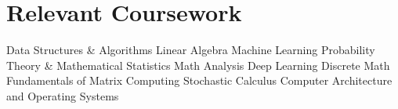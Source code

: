 \section{Relevant Coursework}
\vspace*{-1.5\multicolsep}
\begin{multicols}{4}
    \begin{itemize}[itemsep=0pt, parsep=0pt, leftmargin=*]
        \entry Data Structures \& Algorithms
        \entry Linear Algebra
        \entry Machine Learning
        \entry Probability Theory \& Mathematical Statistics
        \entry Math Analysis
        \entry Deep Learning
        \entry Discrete Math
        \entry Fundamentals of Matrix Computing
        \entry Stochastic Calculus
        \entry Computer Architecture and Operating Systems
    \end{itemize}
\end{multicols}
